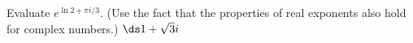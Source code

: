 {Evaluate $e^{\ln 2 + \pi i/3}$. (Use the fact that the properties of real exponents also hold for complex numbers.)
}
{$\ds 1+\sqrt{3} i$
}